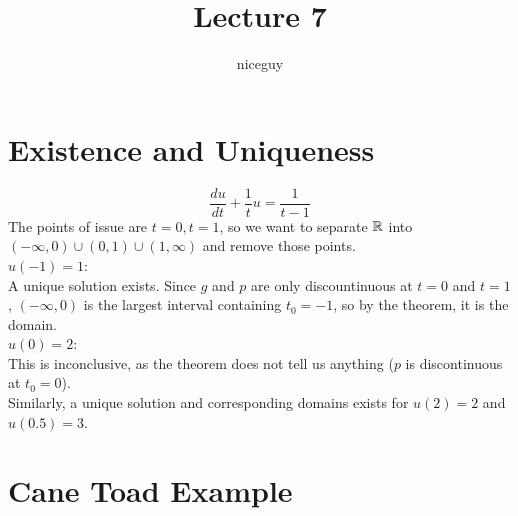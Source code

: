 \documentclass[12pt]{article}
\author{niceguy}
\title{Lecture 7}
\begin{document}
\maketitle

\section{Existence and Uniqueness}

\begin{ex}
	$$\frac{du}{dt} + \frac{1}{t}u = \frac{1}{t-1}$$
	The points of issue are $t=0,t=1$, so we want to separate $\mathbb{R}$ into $(-\infty,0)\cup(0,1)\cup(1,\infty)$ and remove those points. \\
	$u(-1) = 1$: \\
	A unique solution exists. Since $g$ and $p$ are only discountinuous at $t=0$ and $t=1$, $(-\infty,0)$ is the largest interval containing $t_0=-1$, so by the theorem, it is the domain. \\
	$u(0) = 2$: \\
	This is inconclusive, as the theorem does not tell us anything ($p$ is discontinuous at $t_0=0$). \\
	Similarly, a unique solution and corresponding domains exists for $u(2)=2$ and $u(0.5)=3$. \\
\end{ex}

\section{Cane Toad Example}
\end{document}

